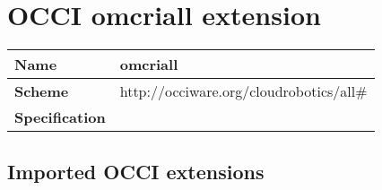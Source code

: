 \section{OCCI omcriall extension}
\begin{center}
\begin{tabular}{|l|l|}
  \hline
  \textbf{Name} & omcriall \\
  \hline  
  \textbf{Scheme} & http://occiware.org/cloudrobotics/all\# \\
  \hline
  \textbf{Specification} &  \\
  \hline
\end{tabular}
\end{center}

\subsection{Imported OCCI extensions}

